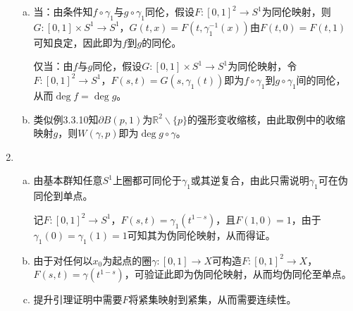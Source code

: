 \documentclass[a4paper,UTF8,fontset=windows]{ctexart}
\begin{document}
\begin{enumerate}[(1)]
\begin{enumerate}[(a)]
    \item
    当：由条件知$f\circ\gamma_1$与$g\circ\gamma_1$同伦，假设$F:[0,1]^2\to S^1$为同伦映射，则$G:[0,1]\times S^1\to S^1$，$G(t,x)=F(t,\gamma_1^{-1}(x))$由$F(t,0)=F(t,1)$可知良定，因此即为$f$到$g$的同伦。
    
    仅当：由$f$与$g$同伦，假设$G:[0,1]\times S^1\to S^1$为同伦映射，令$F:[0,1]^2\to S^1$，$F(s,t)=G(s,\gamma_1(t))$即为$f\circ\gamma_1$到$g\circ\gamma_1$间的同伦，从而$\deg f=\deg g$。
    
    \item
    类似例3.3.10知$\partial B(p,1)$为$\mathbb{R}^2\backslash\{p\}$的强形变收缩核，由此取例中的收缩映射$g$，则$W(\gamma,p)$即为$\deg g\circ\gamma$。
    \end{enumerate}
    
    \item
    \begin{enumerate}[(a)]
    \item
    由基本群知任意$S^1$上圈都可同伦于$\gamma_1$或其逆复合，由此只需说明$\gamma_1$可在伪同伦到单点。
    
    记$F:[0,1]^2\to S^1$，$F(s,t)=\gamma_1(t^{1-s})$，且$F(1,0)=1$，由于$\gamma_1(0)=\gamma_1(1)=1$可知其为伪同伦映射，从而得证。
    
    \item
    由于对任何以$x_0$为起点的圈$\gamma:[0,1]\to X$可构造$F:[0,1]^2\to X$，$F(s,t)=\gamma(t^{1-s})$，可验证此即为伪同伦映射，从而均伪同伦至单点。
    
    \item
    提升引理证明中需要$F$将紧集映射到紧集，从而需要连续性。
    \end{enumerate}
\end{enumerate}
\end{document}

